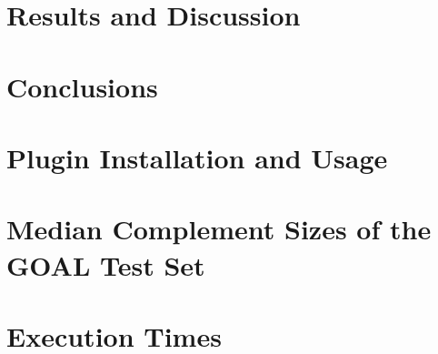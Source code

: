 \documentclass[a4paper,table]{report}
\newcommand{\goal}{GOAL}
\begin{document}
\chapter{Results and Discussion}
\label{chap_results}
\minitoc
\newpage


\chapter{Conclusions}
\label{chap_conclusions}
\newpage



\appendix
\chapter{Plugin Installation and Usage}
\label{app_plugin}


\chapter{Median Complement Sizes of the \goal{} Test Set}
\label{app_matrices}


\chapter{Execution Times}
\label{app_times}












\end{document}
